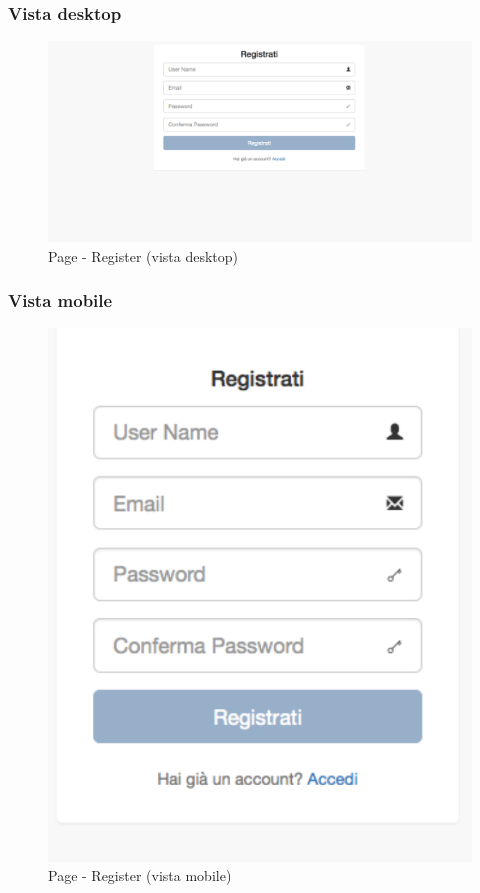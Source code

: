 		\subsubsection{Vista desktop} %
		\begin{figure}[htbp]
			\centering
			\centerline{\includegraphics[scale=0.4]{./images/mockup/register_vd.pdf}}
			\caption{Page - Register (vista desktop)}
		\end{figure}

		\subsubsection{Vista mobile} %
		\begin{figure}[htbp]
			\centering
			\centerline{\includegraphics[scale=0.5]{./images/mockup/register_vm.pdf}}
			\caption{Page - Register (vista mobile)}
		\end{figure}

